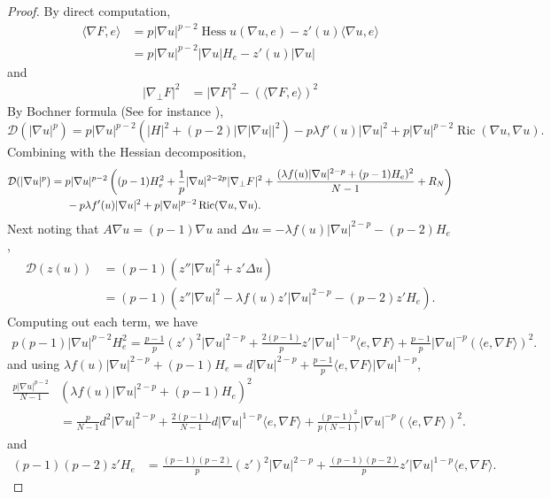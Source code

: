 \documentclass[11pt]{amsart}
\def \hsp {\hspace{0.2 in}}
\DeclareMathOperator{\Ric}{Ric}
\DeclareMathOperator{\Hess}{Hess}
\theoremstyle{definition}
\begin{document}
\begin{proof}
By direct computation,
\begin{align*}
    \langle\nabla F,e\rangle  &= p|\nabla u|^{p-2} \Hess u (\nabla u, e)-z'(u)\langle \nabla u,e\rangle\\
    &=p|\nabla u|^{p-2}|\nabla u| H_e-z'(u)|\nabla u|
\end{align*}
and
\begin{align*}
    |\nabla_\perp F|^2 &= |\nabla F|^2-(\langle \nabla F,e\rangle)^2
\end{align*}
By Bochner formula (See for instance \cite{Valtorta2012}),
\begin{equation}\label{eq:divergence-bochner}
    \mathcal{D}(|\nabla u|^p)= p|\nabla u|^{p-2}(|H|^2+(p-2)|\nabla |\nabla u||^2)-p\lambda f'(u)|\nabla u|^2+p|\nabla u|^{p-2}\Ric(\nabla u,\nabla u).
\end{equation}
Combining with the Hessian decomposition,
\begin{align*}
    \mathcal{D}(|\nabla u|^p)&=p|\nabla u|^{p-2}\left((p-1)H_e^2+\frac{1}{p}|\nabla u|^{2-2p}|\nabla_\perp F|^2+\frac{(\lambda f(u)|\nabla u|^{2-p}+(p-1)H_e)^2}{N-1}+R_N\right) \\
    &\hsp -p\lambda f'(u)|\nabla u|^2+p|\nabla u|^{p-2}\Ric(\nabla u,\nabla u).
\end{align*}
Next noting that $A\nabla u=(p-1)\nabla u$ and $\Delta u=-\lambda f(u)|\nabla u|^{2-p}-(p-2)H_e$,
\begin{align*}
    \mathcal{D}(z(u))&=(p-1)(z''|\nabla u|^2+z'\Delta u)\\
    &=(p-1)(z''|\nabla u|^2-\lambda f(u)z'|\nabla u|^{2-p}-(p-2)z'H_e).
\end{align*}
Computing out each term, we have
\begin{align*}
    p(p-1)|\nabla u|^{p-2}H_e^2=\frac{p-1}{p}(z')^2|\nabla u|^{2-p}+\frac{2(p-1)}{p}z'|\nabla u|^{1-p}\langle e,\nabla F\rangle +\frac{p-1}{p}|\nabla u|^{-p}(\langle e,\nabla F\rangle)^2.
\end{align*}
and using $\lambda f(u)|\nabla u|^{2-p}+(p-1)H_e=d|\nabla u|^{2-p}+\frac{p-1}{p}\langle e,\nabla F\rangle|\nabla u|^{1-p}$,
\begin{align*}
    \frac{p|\nabla u|^{p-2}}{N-1}&(\lambda f(u)|\nabla u|^{2-p}+(p-1)H_e)^2\\
    &= \frac{p}{N-1}d^2|\nabla u|^{2-p}+\frac{2(p-1)}{N-1}d|\nabla u|^{1-p}\langle e,\nabla F\rangle+\frac{(p-1)^2}{p(N-1)}|\nabla u|^{-p}(\langle e,\nabla F\rangle)^2.
\end{align*}
and
\begin{align*}
    (p-1)(p-2)z'H_e&=\frac{(p-1)(p-2)}{p}(z')^2|\nabla u|^{2-p}+\frac{(p-1)(p-2)}{p}z'|\nabla u|^{1-p}\langle e,\nabla F\rangle.

\end{align*}
\end{proof}
\end{document}
